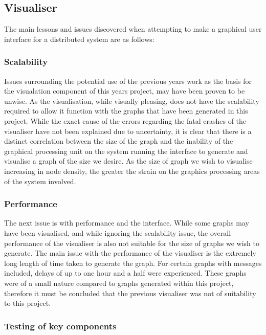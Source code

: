 \subsection{Visualiser}

The main lessons and issues discovered when attempting to make a graphical user interface for a distributed system are as follows:

\subsubsection{Scalability}

Issues surrounding the potential use of the previous years work as the basis for the visualation component of this years project, may have been proven to be unwise. As the visualisation, while visually pleasing, does not have the scalability required to allow it function with the graphs that have been generated in this project. While the exact cause of the errors regarding the fatal crashes of the visualiser have not been explained due to uncertainty, it is clear that there is a distinct correlation between the size of the graph and the inability of the graphical processing unit on the system running the interface to generate and visualise a graph of the size we desire. As the size of graph we wish to visualise increasing in node density, the greater the strain on the graphics processing areas of the system involved. 

\subsubsection{Performance}

The next issue is with performance and the interface. While some graphs may have been visualised, and while ignoring the scalability issue, the overall performance of the visualiser is also not suitable for the size of graphs we wish to generate. The main issue with the performance of the visualiser is the extremely long length of time taken to generate the graph. For certain graphs with messages included, delays of up to one hour and a half were experienced. These graphs were of a small nature compared to graphs generated within this project, therefore it must be concluded that the previous visualiser was not of suitability to this project.

\subsubsection{Testing of key components}

